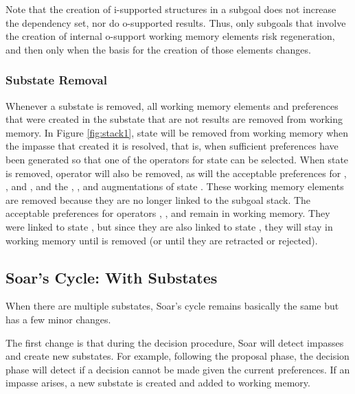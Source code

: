 Note that the creation of i-supported structures in a subgoal does not
increase the dependency set, nor do o-supported results.  Thus, only
subgoals that involve the creation of internal o-support working memory
elements risk regeneration, and then only when the basis for the
creation of those elements changes.

\subsubsection*{Substate Removal}

Whenever a substate is removed, all working memory elements and
preferences that were created in the substate that are not
results are removed from working memory. In Figure \ref{fig:stack1},
state  will be removed from working memory when the impasse
that created it is resolved, that is, when sufficient preferences have
been generated so that one of the operators for state  can be
selected. When state  is removed, operator  will also be removed,
as will the acceptable
preferences for , , and , and the
, , and  augmentations of state
. These working memory elements are removed because they are no
longer linked to the subgoal stack. The acceptable preferences for
operators , , and  remain in working memory. They
were linked to state , but since they are also linked to state
, they will stay in working memory until  is removed (or
until they are retracted or rejected).

\subsection{Soar's Cycle: With Substates}
\label{ARCH-decision-substates}

When there are multiple substates, Soar's cycle remains basically the
same but has a few minor changes.  


The first change is that during the decision procedure, Soar will detect
impasses and create new substates.  For example, following the proposal
phase, the decision phase will detect if a decision cannot be made given
the current preferences.  If an impasse arises, a new substate is
created and added to working memory.  



